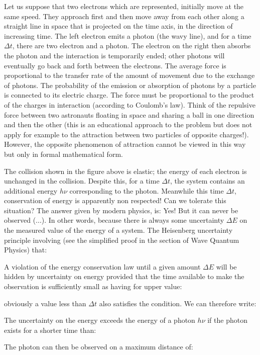 	Let us suppose that two electrons which are represented, initially move at the same speed. They approach first and then move away from each other along a straight line in space that is projected on the time axis, in the direction of increasing time. The left electron emits a photon (the wavy line), and for a time $\Delta t$, there are two electron and a photon. The electron on the right then absorbs the photon and the interaction is temporarily ended; other photons will eventually go back and forth between the electrons. The average force is proportional to the transfer rate of the amount of movement due to the exchange of photons. The probability of the emission or absorption of photons by a particle is connected to its electric charge. The force must be proportional to the product of the charges in interaction (according to Coulomb's law). Think of the repulsive force between two astronauts floating in space and sharing a ball in one direction and then the other (this is an educational approach to the problem but does not apply for example to the attraction between two particles of opposite charges!). However, the opposite phenomenon of attraction cannot be viewed in this way but only in formal mathematical form.
	
	The collision shown in the figure above is elastic; the energy of each electron is unchanged in the collision. Despite this, for a time $\Delta t$, the system contains an additional energy $h\nu$ corresponding to the photon. Meanwhile this time $\Delta t$, conservation of energy is apparently non respected! Can we tolerate this situation? The answer given by modern physics, is: Yes! But it can never be observed (...). In other words, because there is always some uncertainty $\Delta E$ on the measured value of the energy of a system. The Heisenberg uncertainty principle involving (see the simplified proof in the section of Wave Quantum Physics) that:
	
	A violation of the energy conservation law until a given amount $\Delta E$ will be hidden by uncertainty on energy provided that the time available to make the observation is sufficiently small as having for upper value:
	
	obviously a value less than $\Delta t$ also satisfies the condition. We can therefore write:
	
	The uncertainty on the energy exceeds the energy of a photon $h\nu$ if the photon exists for a shorter time than:
	
	The photon can then be observed on a maximum distance of:
	
